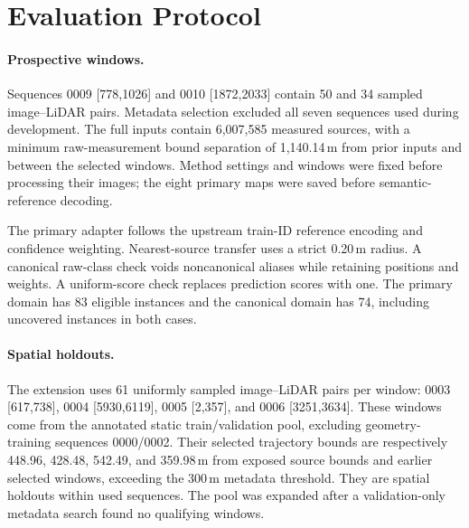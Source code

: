 \section{Evaluation Protocol}\label{app:protocol}
\paragraph{Prospective windows.}
Sequences 0009 [778,1026] and 0010 [1872,2033] contain 50 and 34 sampled image--LiDAR pairs. Metadata selection excluded all seven sequences used during development. The full inputs contain 6,007,585 measured sources, with a minimum raw-measurement bound separation of 1,140.14\,m from prior inputs and between the selected windows. Method settings and windows were fixed before processing their images; the eight primary maps were saved before semantic-reference decoding.

The primary adapter follows the upstream train-ID reference encoding and confidence weighting. Nearest-source transfer uses a strict 0.20\,m radius. A canonical raw-class check voids noncanonical aliases while retaining positions and weights. A uniform-score check replaces prediction scores with one. The primary domain has 83 eligible instances and the canonical domain has 74, including uncovered instances in both cases.

\begin{minipage}[t]{.48\textwidth}\vspace{0pt}\centering\small

\end{minipage}\hfill
\begin{minipage}[t]{.48\textwidth}\vspace{0pt}\centering\small

\end{minipage}

\paragraph{Spatial holdouts.}\label{app:extension}
The extension uses 61 uniformly sampled image--LiDAR pairs per window: 0003 [617,738], 0004 [5930,6119], 0005 [2,357], and 0006 [3251,3634]. These windows come from the annotated static train/validation pool, excluding geometry-training sequences 0000/0002. Their selected trajectory bounds are respectively 448.96, 428.48, 542.49, and 359.98\,m from exposed source bounds and earlier selected windows, exceeding the 300\,m metadata threshold. They are spatial holdouts within used sequences. The pool was expanded after a validation-only metadata search found no qualifying windows.

